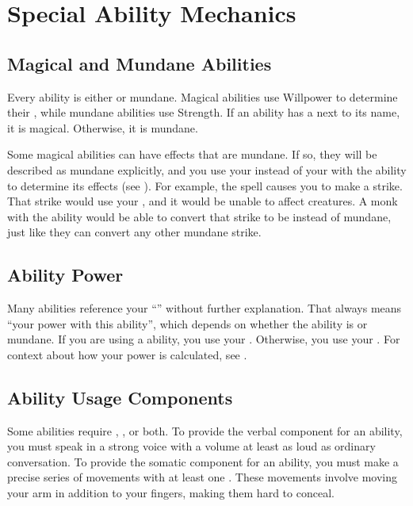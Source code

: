 \section{Special Ability Mechanics}\label{Special Ability Mechanics}

  \subsection{Magical and Mundane Abilities}\label{Magical and Mundane Abilities}
    Every ability is either \magical or mundane.
    Magical abilities use Willpower to determine their , while mundane abilities use Strength.
    If an ability has a \sparkle{} next to its name, it is magical.
    Otherwise, it is mundane.

    Some magical abilities can have effects that are mundane.
    If so, they will be described as mundane explicitly, and you use your  instead of your  with the ability to determine its effects (see ).
    For example, the  spell causes you to make a  strike.
    That strike would use your , and it would be unable to affect  creatures.
    A monk with the  ability would be able to convert that strike to be \magical instead of mundane, just like they can convert any other mundane strike.

  \subsection{Ability Power}\label{Ability Power}
    Many abilities reference your ``'' without further explanation.
    That always means ``your power with this ability'', which depends on whether the ability is \magical or mundane.
    If you are using a \magical ability, you use your .
    Otherwise, you use your .
    For context about how your power is calculated, see .

  \subsection{Ability Usage Components}\label{Ability Usage Components}
    Some abilities require , , or both.
    To provide the verbal component for an ability, you must speak in a strong voice with a volume at least as loud as ordinary conversation.
    To provide the somatic component for an ability, you must make a precise series of movements with at least one .
    These movements involve moving your arm in addition to your fingers, making them hard to conceal.

